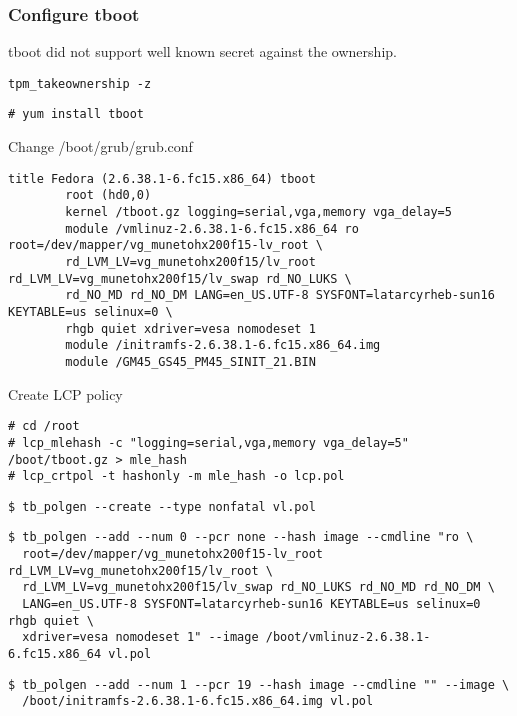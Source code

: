 \subsubsection{Configure tboot}

tboot did not support well known secret against the ownership.
\begin{lstlisting}[style=source_code]
tpm_takeownership -z
\end{lstlisting}

\begin{lstlisting}[style=source_code]
# yum install tboot
\end{lstlisting}
Change /boot/grub/grub.conf
\begin{lstlisting}[style=source_code]
title Fedora (2.6.38.1-6.fc15.x86_64) tboot
        root (hd0,0)
        kernel /tboot.gz logging=serial,vga,memory vga_delay=5
        module /vmlinuz-2.6.38.1-6.fc15.x86_64 ro root=/dev/mapper/vg_munetohx200f15-lv_root \
        rd_LVM_LV=vg_munetohx200f15/lv_root rd_LVM_LV=vg_munetohx200f15/lv_swap rd_NO_LUKS \
        rd_NO_MD rd_NO_DM LANG=en_US.UTF-8 SYSFONT=latarcyrheb-sun16 KEYTABLE=us selinux=0 \
        rhgb quiet xdriver=vesa nomodeset 1
        module /initramfs-2.6.38.1-6.fc15.x86_64.img
        module /GM45_GS45_PM45_SINIT_21.BIN
\end{lstlisting}
Create LCP policy
\begin{lstlisting}[style=source_code]
# cd /root
# lcp_mlehash -c "logging=serial,vga,memory vga_delay=5" /boot/tboot.gz > mle_hash
# lcp_crtpol -t hashonly -m mle_hash -o lcp.pol
\end{lstlisting}

\begin{lstlisting}[style=source_code]
$ tb_polgen --create --type nonfatal vl.pol
\end{lstlisting}

\begin{lstlisting}[style=source_code]
$ tb_polgen --add --num 0 --pcr none --hash image --cmdline "ro \
  root=/dev/mapper/vg_munetohx200f15-lv_root rd_LVM_LV=vg_munetohx200f15/lv_root \
  rd_LVM_LV=vg_munetohx200f15/lv_swap rd_NO_LUKS rd_NO_MD rd_NO_DM \
  LANG=en_US.UTF-8 SYSFONT=latarcyrheb-sun16 KEYTABLE=us selinux=0 rhgb quiet \
  xdriver=vesa nomodeset 1" --image /boot/vmlinuz-2.6.38.1-6.fc15.x86_64 vl.pol
\end{lstlisting}

\begin{lstlisting}[style=source_code]
$ tb_polgen --add --num 1 --pcr 19 --hash image --cmdline "" --image \
  /boot/initramfs-2.6.38.1-6.fc15.x86_64.img vl.pol
\end{lstlisting}

